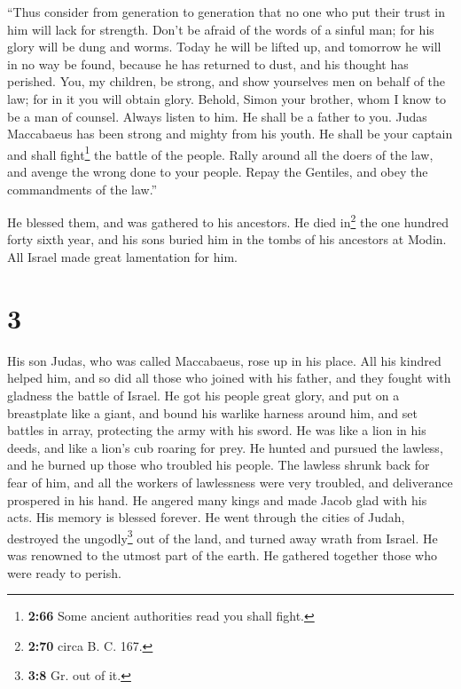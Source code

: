  ``Thus consider from generation to generation that no
one who put their trust in him will lack for strength. 
Don't be afraid of the words of a sinful man; for his glory will be dung
and worms.  Today he will be lifted up, and tomorrow he
will in no way be found, because he has returned to dust, and his
thought has perished.  You, my children, be strong, and
show yourselves men on behalf of the law; for in it you will obtain
glory.  Behold, Simon your brother, whom I know to be a
man of counsel. Always listen to him. He shall be a father to you.
 Judas Maccabaeus has been strong and mighty from his
youth. He shall be your captain and shall fight\footnote{\textbf{2:66}
  Some ancient authorities read you shall fight.} the battle of the
people.  Rally around all the doers of the law, and
avenge the wrong done to your people.  Repay the
Gentiles, and obey the commandments of the law.''

 He blessed them, and was gathered to his ancestors.
 He died in\footnote{\textbf{2:70} circa B. C. 167.} the
one hundred forty sixth year, and his sons buried him in the tombs of
his ancestors at Modin. All Israel made great lamentation for him.

\hypertarget{section-2}{%
\section{3}\label{section-2}}

 His son Judas, who was called Maccabaeus, rose up in his
place.  All his kindred helped him, and so did all those
who joined with his father, and they fought with gladness the battle of
Israel.  He got his people great glory, and put on a
breastplate like a giant, and bound his warlike harness around him, and
set battles in array, protecting the army with his sword. 
He was like a lion in his deeds, and like a lion's cub roaring for prey.
 He hunted and pursued the lawless, and he burned up those
who troubled his people.  The lawless shrunk back for fear
of him, and all the workers of lawlessness were very troubled, and
deliverance prospered in his hand.  He angered many kings
and made Jacob glad with his acts. His memory is blessed forever.
 He went through the cities of Judah, destroyed the
ungodly\footnote{\textbf{3:8} Gr. out of it.} out of the land, and
turned away wrath from Israel.  He was renowned to the
utmost part of the earth. He gathered together those who were ready to
perish.

